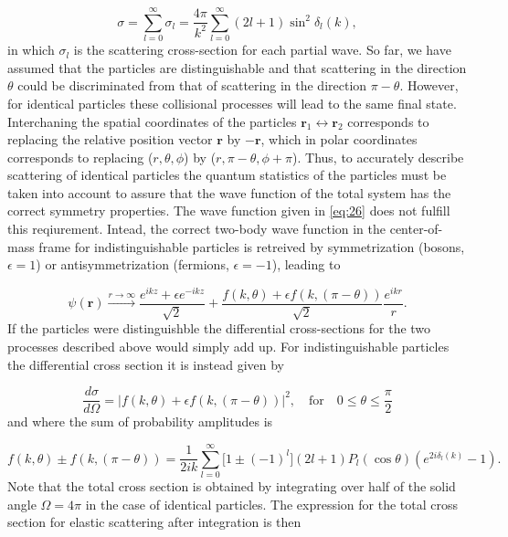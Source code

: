 \documentclass{article}
\providecommand{\abs}[1]{\lvert#1\rvert} \providecommand{\norm}[1]{\lVert#1\rVert}
\numberwithin{equation}{section}
\begin{document}
\begin{equation}
\sigma= \sum_{l=0}^{\infty} \sigma_l = \frac{4\pi}{k^2}\sum_{l=0}^{\infty}(2l+1)\sin^2\delta_l(k),
\end{equation}
in which $\sigma_l$ is the scattering cross-section for each partial wave. So far, we have assumed that the particles are distinguishable and that scattering in the direction $\theta$ could be discriminated from that of scattering in the direction $\pi-\theta$. However, for identical particles these collisional processes will lead to the same final state. Interchaning the spatial coordinates of the particles $\mathbf{r}_1 \leftrightarrow \mathbf{r}_2$ corresponds to replacing the relative position vector $\mathbf{r}$ by $-\mathbf{r}$, which in polar coordinates corresponds to replacing ($r,\theta,\phi$) by ($r,\pi-\theta,\phi+\pi$). Thus, to accurately describe scattering of identical particles the quantum statistics of the particles must be taken into account to assure that the wave function of the total system has the correct symmetry properties. The wave function given in \eqref{eq:26} does not fulfill this reqiurement. Intead, the correct two-body wave function in the center-of-mass frame for indistinguishable particles is retreived by symmetrization (bosons, $\epsilon = 1$) or antisymmetrization (fermions, $\epsilon = -1$), leading to

\begin{equation}
\psi(\mathbf{r}) \xrightarrow{r \to \infty} \frac{e^{ikz} + \epsilon e^{-ikz}}{\sqrt{2}} + \frac{f(k,\theta)+\epsilon f(k,(\pi-\theta))}{\sqrt{2}}\frac{e^{ikr}}{r}.
\end{equation}
If the particles were distinguishble the differential cross-sections for the two processes described above would simply add up. For indistinguishable particles the differential cross section it is instead given by

\begin{equation}
\frac{d\sigma}{d\Omega} = \abs{f(k,\theta)+\epsilon f(k,(\pi-\theta))}^2, \quad \text{for} \quad 0 \leq \theta \leq \frac{\pi}{2}
\end{equation}
and where the sum of probability amplitudes is

\begin{equation}
f(k,\theta) \pm f(k,(\pi-\theta)) = \frac{1}{2ik}\sum_{l=0}^{\infty} \big[1 \pm (-1)^l\big](2l+1)P_l(\cos\theta)(e^{2i\delta_l(k)} - 1).
\end{equation}
Note that the total cross section is obtained by integrating over half of the solid angle $\Omega =4\pi$ in the case of identical particles. The expression for the total cross section for elastic scattering after integration is then
\end{document}
